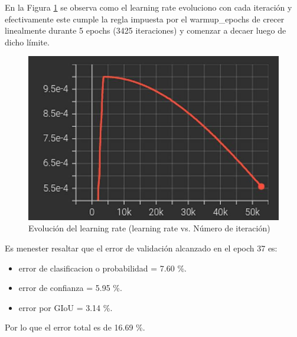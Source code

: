 En la Figura \ref{learning_rate_result} se observa como el learning rate evoluciono con cada iteración y efectivamente este cumple la regla impuesta por el warmup\_epochs de crecer linealmente durante 5 epochs (3425 iteraciones) y comenzar a decaer luego de dicho límite.
\begin{figure}[H]
    \centering
    \includegraphics[scale=0.6]{Recursos/learning_rate_evolution_result.jpg}
    \caption{Evolución del learning rate (learning rate vs. Número de iteración)}
    \label{learning_rate_result}
\end{figure}
Es menester resaltar que el error de validación alcanzado en el epoch 37 es:
\begin{itemize}
    \item error de clasificacion o probabilidad = 7.60 \%.
    \item error de confianza = 5.95 \%.
    \item error por GIoU = 3.14 \%.
\end{itemize}
Por lo que el error total es de 16.69 \%.
